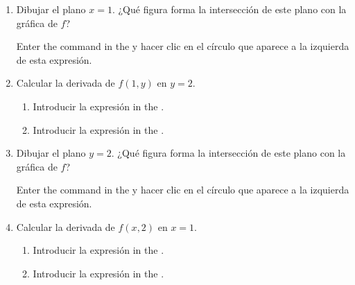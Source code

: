 \begin{enumerate}[leftmargin=*]
\begin{enumerate}
\begin{indication}
            \end{indication}


      \item Dibujar el plano $x=1$. ¿Qué figura forma la intersección de este plano con la gráfica de $f$?
            \begin{indication}
            Enter the command  in the  y hacer clic en el círculo que aparece a la izquierda de esta expresión.
            \end{indication}

      \item Calcular la derivada de $f(1,y)$ en $y=2$.
            \begin{indication}
            \begin{enumerate}
            \item Introducir la expresión  in the .
            \item Introducir la expresión  in the .
            \end{enumerate}
            \end{indication}

      \item Dibujar el plano $y=2$. ¿Qué figura forma la intersección de este plano con la gráfica de $f$?
            \begin{indication}
            Enter the command  in the  y hacer clic en el círculo que aparece a la izquierda de esta expresión.
            \end{indication}

      \item Calcular la derivada de $f(x,2)$ en $x=1$.
            \begin{indication}
            \begin{enumerate}
            \item Introducir la expresión  in the .
            \item Introducir la expresión  in the .
            \end{enumerate}
            \end{indication}


\end{enumerate}
\end{enumerate}
